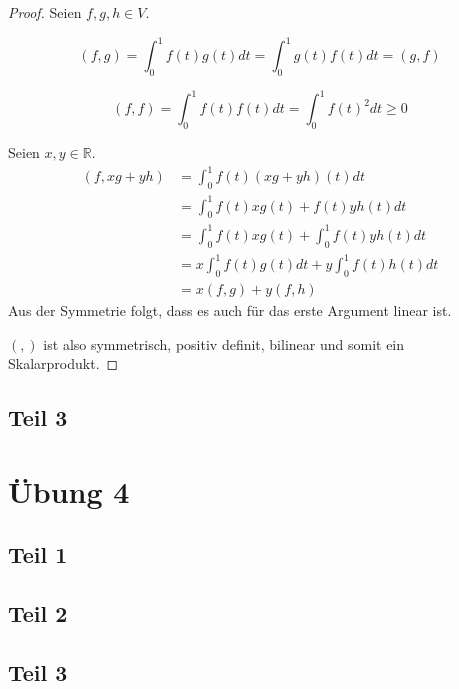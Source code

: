 \documentclass[a4paper,10pt]{article}
\begin{document}
\begin{proof}
 Seien $f, g, h \in V$.
 
 \begin{equation}
  (f, g) = \int_0^1 f(t) g(t) dt = \int_0^1 g(t) f(t) dt = (g, f)
 \end{equation}
 
 \begin{equation}
  (f, f) = \int_0^1 f(t) f(t) dt = \int_0^1 f(t)^2 dt \ge 0
 \end{equation}
 
 Seien $x, y \in \mathbb{R}$.
 \begin{align*}
  (f, xg + yh) & = \int_0^1 f(t) (xg + yh)(t) dt\\
  & = \int_0^1 f(t)xg(t) + f(t)yh(t) dt\\
  & = \int_0^1 f(t)xg(t) + \int_0^1 f(t)yh(t) dt\\
  & = x\int_0^1 f(t)g(t) dt + y\int_0^1 f(t)h(t) dt\\
  & = x(f, g) + y(f, h)
 \end{align*}
 Aus der Symmetrie folgt, dass es auch für das erste Argument linear ist.

 $(,)$ ist also symmetrisch, positiv definit, bilinear und somit ein Skalarprodukt.
\end{proof}

\subsection*{Teil 3}



\section*{Übung 4}

\subsection*{Teil 1}

\subsection*{Teil 2}

\subsection*{Teil 3}
\end{document}
